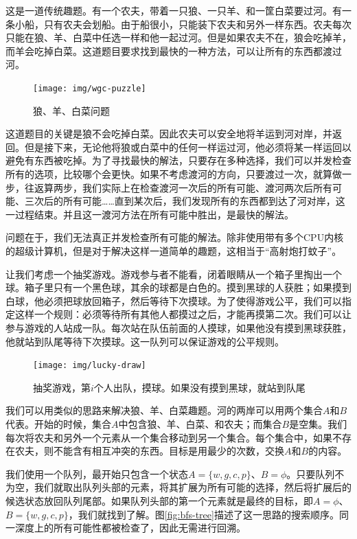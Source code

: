 \documentclass[b5paper]{ctexart}
\begin{document}
这是一道传统趣题。有一个农夫，带着一只狼、一只羊、和一筐白菜要过河。有一条小船，只有农夫会划船。由于船很小，只能装下农夫和另外一样东西。农夫每次只能在狼、羊、白菜中任选一样和他一起过河。但是如果农夫不在，狼会吃掉羊，而羊会吃掉白菜。这道题目要求找到最快的一种方法，可以让所有的东西都渡过河。

\begin{figure}[htbp]
 \centering
 \texttt{[image: img/wgc-puzzle]}
 \caption{狼、羊、白菜问题}
 \label{fig:wgc-puzzle}
\end{figure}

这道题目的关键是狼不会吃掉白菜。因此农夫可以安全地将羊运到河对岸，并返回。但是接下来，无论他将狼或白菜中的任何一样运过河，他必须将某一样运回以避免有东西被吃掉。为了寻找最快的解法，只要存在多种选择，我们可以并发检查所有的选项，比较哪个会更快。如果不考虑渡河的方向，只要渡过一次，就算做一步，往返算两步，我们实际上在检查渡河一次后的所有可能、渡河两次后所有可能、三次后的所有可能……直到某次后，我们发现所有的东西都到达了河对岸，这一过程结束。并且这一渡河方法在所有可能中胜出，是最快的解法。

问题在于，我们无法真正并发检查所有可能的解法。除非使用带有多个CPU内核的超级计算机，但是对于解决这样一道简单的趣题，这相当于“高射炮打蚊子”。

让我们考虑一个抽奖游戏。游戏参与者不能看，闭着眼睛从一个箱子里掏出一个球。箱子里只有一个黑色球，其余的球都是白色的。摸到黑球的人获胜；如果摸到白球，他必须把球放回箱子，然后等待下次摸球。为了使得游戏公平，我们可以指定这样一个规则：必须等待所有其他人都摸过之后，才能再摸第二次。我们可以让参与游戏的人站成一队。每次站在队伍前面的人摸球，如果他没有摸到黑球获胜，他就站到队尾等待下次摸球。这一队列可以保证游戏的公平规则。

\begin{figure}[htbp]
 \centering
 \texttt{[image: img/lucky-draw]}
 \caption{抽奖游戏，第$i$个人出队，摸球。如果没有摸到黑球，就站到队尾}
 \label{fig:luck-draw}
\end{figure}

我们可以用类似的思路来解决狼、羊、白菜趣题。河的两岸可以用两个集合$A$和$B$代表。开始的时候，集合$A$中包含狼、羊、白菜、和农夫；而集合$B$是空集。我们每次将农夫和另外一个元素从一个集合移动到另一个集合。每个集合中，如果不存在农夫，则不能含有相互冲突的东西。目标是用最少的次数，交换$A$和$B$的内容。

我们使用一个队列，最开始只包含一个状态$A = \{w, g, c, p\}$、$B=\phi$。只要队列不为空，我们就取出队列头部的元素，将其扩展为所有可能的选择，然后将扩展后的候选状态放回队列尾部。如果队列头部的第一个元素就是最终的目标，即$A=\phi$、$B=\{w, g, c, p\}$，我们就找到了解。图\ref{fig:bfs-tree}描述了这一思路的搜索顺序。同一深度上的所有可能性都被检查了，因此无需进行回溯。
\end{document}
